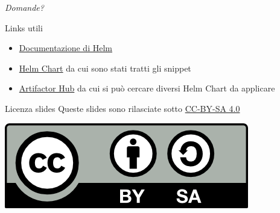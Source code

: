 \documentclass{beamer}
\begin{document}
\begin{frame}{}
\centering \Large \emph{Domande?}
\end{frame}
\begin{frame}{Links utili}
\begin{itemize}
    \item \href{https://helm.sh/docs/}{Documentazione di Helm}
    \item \href{https://github.com/bitnami/charts/tree/main/bitnami/wordpress}{Helm Chart} da cui sono stati tratti gli snippet
    \item \href{https://artifacthub.io/}{Artifactor Hub} da cui si può cercare diversi Helm Chart da applicare
\end{itemize}
\end{frame}
\begin{frame}{Licenza slides}
\centering
Queste slides sono rilasciate sotto \href{https://creativecommons.org/licenses/by-sa/4.0/}{CC-BY-SA 4.0}
\begin{center} \includegraphics{img/by-sa.png} \end{center}
\end{frame}
\end{document}
